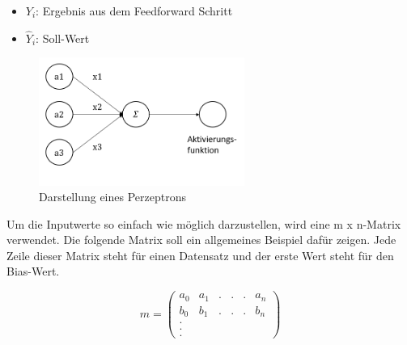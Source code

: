 \begin{itemize}
    \RaggedRight \item[] \(Y_i\): Ergebnis aus dem Feedforward Schritt
    \RaggedRight \item[] \(\hat{Y}_i\): Soll-Wert
\end{itemize}

\newline 

\begin{figure}[H]
	\centering
		\includegraphics[width=0.6\textwidth]{images/h_nn.png}
	\caption{Darstellung eines Perzeptrons}
	\label{fig:h_nn}
\end{figure}

Um die Inputwerte so einfach wie möglich darzustellen, wird eine m x n-Matrix verwendet. Die folgende Matrix soll ein allgemeines Beispiel dafür zeigen. Jede Zeile dieser Matrix steht für einen Datensatz und der erste Wert steht für den Bias-Wert.

\[m = \begin{pmatrix}a_0 & a_1 & . & . & . & a_n \\  b_0 & b_1 & . & . & . & b_n \\ . \\ . \\ .\end{pmatrix}\]

